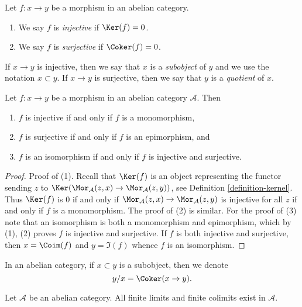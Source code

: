 \begin{definition}
\label{definition-injective-surjective}
Let $f : x \to y$ be a morphism in an abelian category.
\begin{enumerate}
\item We say $f$ is {\it injective} if $\Ker(f) = 0$.
\item We say $f$ is {\it surjective} if $\Coker(f) = 0$.
\end{enumerate}
If $x \to y$ is injective, then we say that $x$ is a {\it subobject}
of $y$ and we use the notation $x \subset y$. If $x \to y$ is
surjective, then we say that $y$ is a {\it quotient} of $x$.
\end{definition}

\begin{lemma}
\label{lemma-characterize-injective}
Let $f : x \to y$ be a morphism in an abelian category $\mathcal{A}$. Then
\begin{enumerate}
\item $f$ is injective if and only if $f$ is a monomorphism,
\item $f$ is surjective if and only if $f$ is an epimorphism, and
\item $f$ is an isomorphism if and only if $f$ is injective and surjective.
\end{enumerate}
\end{lemma}

\begin{proof}
Proof of (1). Recall that $\Ker(f)$ is an object representing the
functor sending $z$ to
$\Ker(\Mor_\mathcal{A}(z, x) \to \Mor_\mathcal{A}(z, y))$, see
Definition \ref{definition-kernel}.
Thus $\Ker(f)$ is $0$ if and only if
$\Mor_\mathcal{A}(z, x) \to \Mor_\mathcal{A}(z, y)$
is injective for all $z$ if and only if $f$ is a monomorphism.
The proof of (2) is similar.
For the proof of (3) note that an isomorphism is both a monomorphism
and epimorphism, which by (1), (2) proves $f$ is injective
and surjective. If $f$ is both injective and surjective, then
$x = \Coim(f)$ and $y = \Im(f)$ whence $f$ is an isomorphism.
\end{proof}

\noindent
In an abelian category, if $x \subset y$ is a subobject,
then we denote
$$
y/x = \Coker(x \to y).
$$

\begin{lemma}
\label{lemma-colimit-abelian-category}
Let $\mathcal{A}$ be an abelian category.
All finite limits and finite colimits exist in $\mathcal{A}$.
\end{lemma}


